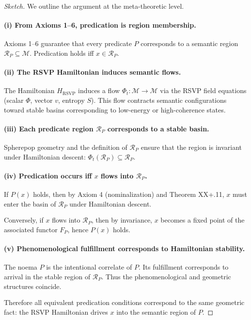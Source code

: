 \documentclass[12pt,letterpaper]{article}
\begin{document}
\begin{proof}[Sketch]
We outline the argument at the meta-theoretic level.

\paragraph{(i) From Axioms 1–6, predication is region membership.}
Axioms 1–6 guarantee that every predicate $P$ corresponds to a semantic region
$\mathcal{R}_P \subseteq \mathcal{M}$.  Predication holds iff $x \in
\mathcal{R}_P$.

\paragraph{(ii) The RSVP Hamiltonian induces semantic flows.}
The Hamiltonian $H_{\mathrm{RSVP}}$ induces a flow $\Phi_t : \mathcal{M} \to
\mathcal{M}$ via the RSVP field equations (scalar $\Phi$, vector $v$, entropy
$S$).  This flow contracts semantic configurations toward stable basins
corresponding to low-energy or high-coherence states.

\paragraph{(iii) Each predicate region $\mathcal{R}_P$ corresponds to a stable basin.}
Spherepop geometry and the definition of $\mathcal{R}_P$ ensure that the region
is invariant under Hamiltonian descent: $\Phi_t(\mathcal{R}_P) \subseteq
\mathcal{R}_P$.

\paragraph{(iv) Predication occurs iff $x$ flows into $\mathcal{R}_P$.}
If $P(x)$ holds, then by Axiom 4 (nominalization) and Theorem XX+.11, $x$ must
enter the basin of $\mathcal{R}_P$ under Hamiltonian descent.

Conversely, if $x$ flows into $\mathcal{R}_P$, then by invariance, $x$ becomes a
fixed point of the associated functor $F_P$, hence $P(x)$ holds.

\paragraph{(v) Phenomenological fulfillment corresponds to Hamiltonian stability.}
The noema $\widehat{P}$ is the intentional correlate of $P$.  Its fulfillment
corresponds to arrival in the stable region of $\mathcal{R}_P$.  Thus the
phenomenological and geometric structures coincide.

Therefore all equivalent predication conditions correspond to the same geometric
fact: the RSVP Hamiltonian drives $x$ into the semantic region of $P$.
\end{proof}
\end{document}
